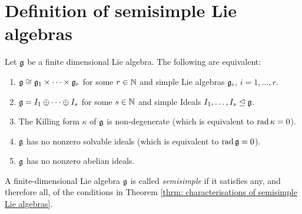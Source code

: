\section{Definition of semisimple Lie algebras}


\begin{thrm}\label{thrm: characterisations of semisimple Lie algebras}
 Let $\mathfrak{g}$ be a finite dimensional Lie algebra. The following are equivalent:
 \begin{enumerate}[leftmargin=*]
  \item
   $\mathfrak{g} \cong \mathfrak{g}_1 \times \dotsb \times \mathfrak{g}_r$ for some $r \in \mathbb{N}$ and simple Lie algebras $\mathfrak{g}_i$, $i = 1, \dotsc, r$.
  \item
   $\mathfrak{g} = I_1 \oplus \dotsb \oplus I_s$ for some $s \in \mathbb{N}$ and simple Ideals $I_1, \dotsc, I_s \trianglelefteq \mathfrak{g}$.
  \item
   The Killing form $\kappa$ of $\mathfrak{g}$ is non-degenerate (which is equivalent to $\operatorname{rad} \kappa = 0$).
  \item
   $\mathfrak{g}$ has no nonzero solvable ideals (which is equivalent to $\operatorname{rad} \mathfrak{g} = 0$).
  \item
   $\mathfrak{g}$ has no nonzero abelian ideals.
 \end{enumerate}
\end{thrm}


\begin{defi}
 A finite-dimensional Lie algebra $\mathfrak{g}$ is called \emph{semisimple} if it satisfies any, and therefore all, of the conditions in Theorem \ref{thrm: characterisations of semisimple Lie algebras}.
\end{defi}
